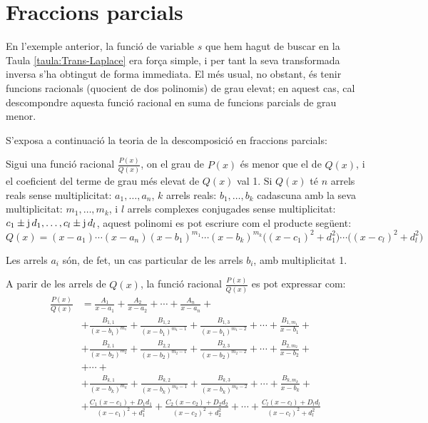 \section{Fraccions parcials}

En l'exemple anterior, la funci\'{o} de variable $s$ que hem hagut de
buscar en la Taula \vref{taula:Trans-Laplace} era for\c{c}a simple, i
per tant la seva transformada inversa s'ha obtingut de forma
immediata. El m\'{e}s usual, no obstant, \'{e}s tenir funcions racionals
(quocient de dos polinomis) de grau elevat; en aquest cas, cal
descompondre aquesta funci\'{o} racional en suma de funcions parcials de
grau menor.

S'exposa a continuaci\'{o} la teoria de la descomposici\'{o} en fraccions
parcials:

Sigui una funci\'{o} racional $\frac{P(x)}{Q(x)}$, on el grau de $P(x)$
\'{e}s menor que el de $Q(x)$, i el coeficient del terme de grau m\'{e}s
elevat de $Q(x)$ val 1. Si $Q(x)$ t\'{e} $n$ arrels reals sense
multiplicitat: $a_1,\ldots,a_n$, $k$ arrels reals: $b_1,\ldots,b_k$
cadascuna amb la seva multiplicitat: $m_1,\ldots,m_k$, i $l$ arrels
complexes conjugades sense multiplicitat: $c_1\pm
\mathrm{j}\,d_1,\ldots,c_l\pm \mathrm{j}\,d_l$, aquest polinomi es pot escriure
com el producte seg\"{u}ent:
\begin{equation}
    Q(x)= (x-a_1) \cdots (x-a_n)(x-b_1)^{m_1} \cdots (x-b_k)^{m_k}
    \bigl((x-c_1)^2+d_1^2\bigr)\cdots\bigl((x-c_l)^2+d_l^2\bigr)
\end{equation}

Les arrels $a_i$ s\'{o}n, de fet, un cas particular de les arrels $b_i$,
amb multiplicitat 1.

A parir de les arrels de $Q(x)$, la funci\'{o}  racional
$\frac{P(x)}{Q(x)}$ es pot expressar com:
\begin{equation}\begin{split}
    \frac{P(x)}{Q(x)} &= \frac{A_1}{x-a_1} + \frac{A_2}{x-a_2}
    + \cdots + \frac{A_n}{x-a_n} +{} \\[1.5ex]
   &+ \frac{B_{1,1}}{(x-b_1)^{m_1}} + \frac{B_{1,2}}{(x-b_1)^{m_1-1}}
   + \frac{B_{1,3}}{(x-b_1)^{m_1-2}} + \cdots +
   \frac{B_{1,m_1}}{x-b_1}+{} \\[1.5ex]
&+ \frac{B_{2,1}}{(x-b_2)^{m_2}} + \frac{B_{2,2}}{(x-b_2)^{m_2-1}}
   + \frac{B_{2,3}}{(x-b_2)^{m_2-2}} + \cdots  +
   \frac{B_{2,m_2}}{x-b_2} +{}\\[1.5ex]
   &+ \cdots +\\[1ex]
&+ \frac{B_{k,1}}{(x-b_k)^{m_k}} + \frac{B_{k,2}}{(x-b_k)^{m_k-1}}
   + \frac{B_{k,3}}{(x-b_k)^{m_k-2}} + \cdots +
   \frac{B_{k,m_k}}{x-b_k}+{}\\[1.5ex]
&+ \frac{C_1(x-c_1)+D_1 d_1}{(x-c_1)^2+d_1^2}+ \frac{C_2(x-c_2)+D_2
d_2}{(x-c_2)^2+d_2^2} +  \cdots +\frac{C_l(x-c_l)+D_l d_l}{(x-c_l)^2+d_l^2}\\[1.5ex]
\end{split}\end{equation}

